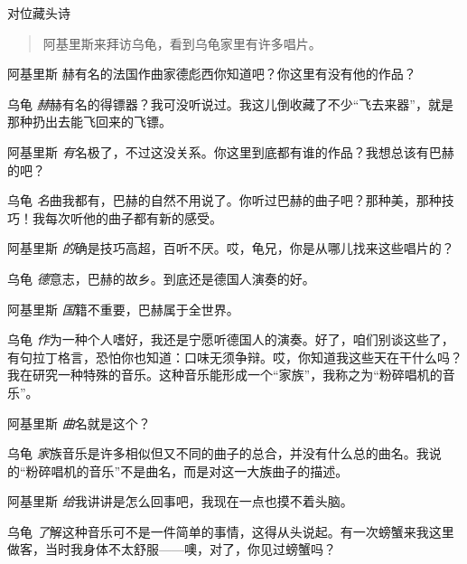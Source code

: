 
\begin{dialog}{对位藏头诗}

\begin{quote}
阿基里斯来拜访乌龟，看到乌龟家里有许多唱片。
\end{quote}

\begin{dialogue}

\item[阿基里斯]赫有名的法国作曲家德彪西你知道吧？你这里有没有他的作品？

\item[乌龟]\emph{赫}赫有名的得镖器？我可没听说过。我这儿倒收藏了不少“飞去来器”，就是那种扔出去能飞回来的飞镖。

\item[阿基里斯]\emph{有}名极了，不过这没关系。你这里到底都有谁的作品？我想总该有巴赫的吧？

\item[乌龟]\emph{名}曲我都有，巴赫的自然不用说了。你听过巴赫的曲子吧？那种美，那种技巧！我每次听他的曲子都有新的感受。

\item[阿基里斯]\emph{的}确是技巧高超，百听不厌。哎，龟兄，你是从哪儿找来这些唱片的？

\item[乌龟]\emph{德}意志，巴赫的故乡。到底还是德国人演奏的好。

\item[阿基里斯]\emph{国}籍不重要，巴赫属于全世界。

\item[乌龟]\emph{作}为一种个人嗜好，我还是宁愿听德国人的演奏。好了，咱们别谈这些了，有句拉丁格言，恐怕你也知道：口味无须争辩。哎，你知道我这些天在干什么吗？我在研究一种特殊的音乐。这种音乐能形成一个“家族”，我称之为“粉碎唱机的音乐”。

\item[阿基里斯]\emph{曲}名就是这个？

\item[乌龟]\emph{家}族音乐是许多相似但又不同的曲子的总合，并没有什么总的曲名。我说的“粉碎唱机的音乐”不是曲名，而是对这一大族曲子的描述。

\item[阿基里斯]\emph{给}我讲讲是怎么回事吧，我现在一点也摸不着头脑。

\item[乌龟]\emph{了}解这种音乐可不是一件简单的事情，这得从头说起。有一次螃蟹来我这里做客，当时我身体不太舒服——噢，对了，你见过螃蟹吗？


\end{dialogue}
\end{dialog}
